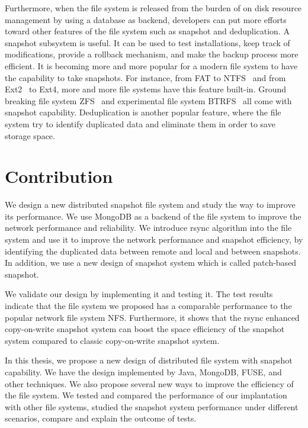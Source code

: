     Furthermore, when the file system is released from the burden of on disk resource management by using a database as backend, developers can put more efforts toward other features of the file system such as snapshot and deduplication. A snapshot subsystem is useful. It can be used to test installations, keep track of modifications, provide a rollback mechanism, and make the backup process more efficient. It is becoming more and more popular for a modern file system to have the capability to take snapshots. For instance, from FAT to NTFS~\cite{ntfs} and from Ext2~\cite{ext2_wiki} to Ext4, more and more file systems have this feature built-in. Ground breaking file system ZFS~\cite{zfs_wiki} and experimental file system BTRFS~\cite{btrfs} all come with snapshot capability. Deduplication is another popular feature, where the file system try to identify duplicated data and eliminate them in order to save storage space.

\section{Contribution}

    We design a new distributed snapshot file system and study the way to improve its performance. We use MongoDB as a backend of the file system to improve the network performance and reliability. We introduce rsync algorithm into the file system and use it to improve the network performance and snapshot efficiency, by identifying the duplicated data between remote and local and between snapshots. In addition, we use a new design of snapshot system which is called patch-based snapshot. 

    We validate our design by implementing it and testing it. The test results indicate that the file system we proposed has a comparable performance to the popular network file system NFS. Furthermore, it shows that the rsync enhanced copy-on-write snapshot system can boost the space efficiency of the snapshot system compared to classic copy-on-write snapshot system.

    In this thesis, we propose a new design of distributed file system with snapshot capability. We have the design implemented by Java, MongoDB, FUSE, and other techniques. We also propose several new ways to improve the efficiency of the file system. We tested and compared the performance of our implantation with other file systems, studied the snapshot system performance under different scenarios, compare and explain the outcome of tests.

